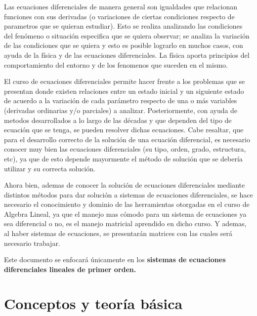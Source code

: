 \documentclass[titlepage]{article}
\begin{document}
        Las ecuaciones diferenciales de manera general son igualdades que relacionan funciones con sus derivadas (o variaciones de ciertas condiciones respecto de parametros que se quieran estudiar). Esto se realiza analizando las condiciones del fenómeno o situación especifica que se quiera observar; se analiza la variación de las condiciones que se quiera y esto es posible lograrlo en muchos casos, con ayuda de la física y de las ecuaciones diferenciales. La física aporta principios del comportamiento del entorno y de los fenomenos que suceden en el mismo. \par\vspace{0.4cm}
        El curso de ecuaciones diferenciales permite hacer frente a los problemas que se presentan donde existen relaciones entre un estado inicial y un siguiente estado de acuerdo a la variación de cada parámetro respecto de una o más variables (derivadas ordinarias y/o parciales) a analizar. Posteriormente, con ayuda de metodos desarrollados a lo largo de las décadas y que dependen del tipo de ecuación que se tenga, se pueden resolver dichas ecuaciones. Cabe resaltar, que para el desarrollo correcto de la solución de una ecuación diferencial, es necesario conocer muy bien las ecuaciones diferenciales (su tipo, orden, grado, estructura, etc), ya que de esto depende mayormente el método de solución que se debería utilizar y su correcta solución.\par\vspace{0.4cm}
        Ahora bien, ademas de conocer la solución de ecuaciones diferenciales mediante distintos métodos para dar solución a sistemas de ecuaciones diferenciales, se hace necesario el conocimiento y dominio de las herramientas otorgadas en el curso de Algebra Lineal, ya que el manejo mas cómodo para un sistema de ecuaciones ya sea diferencial o no, es el manejo matricial aprendido en dicho curso. Y ademas, al haber sistemas de ecuaciones, se presentarán matrices con las cuales será necesario trabajar.\par\vspace{0.4cm}
        Este documento se enfocará únicamente en los \textbf{sistemas de ecuaciones diferenciales lineales de primer orden.} \par\vspace{5cm}
        \vfill
    
    \section{Conceptos y teoría básica}
        
\end{document}
